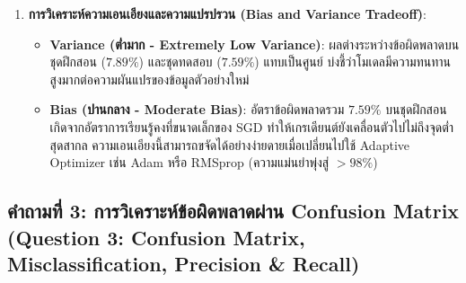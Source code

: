 \documentclass[12pt,a4paper]{article}
\begin{document}
\begin{ansbox}
\begin{enumerate}[leftmargin=18pt, itemsep=3pt]
    \item \textbf{การวิเคราะห์ความเอนเอียงและความแปรปรวน (Bias and Variance Tradeoff)}:
    \begin{itemize}[leftmargin=12pt, itemsep=2pt]
        \item \textbf{Variance (ต่ำมาก - Extremely Low Variance)}: ผลต่างระหว่างข้อผิดพลาดบนชุดฝึกสอน ($7.89\%$) และชุดทดสอบ ($7.59\%$) แทบเป็นศูนย์ บ่งชี้ว่าโมเดลมีความทนทานสูงมากต่อความผันแปรของข้อมูลตัวอย่างใหม่
        \item \textbf{Bias (ปานกลาง - Moderate Bias)}: อัตราข้อผิดพลาดรวม $7.59\%$ บนชุดฝึกสอนเกิดจากอัตราการเรียนรู้คงที่ขนาดเล็กของ SGD ทำให้เกรเดียนต์ยังเคลื่อนตัวไปไม่ถึงจุดต่ำสุดสากล ความเอนเอียงนี้สามารถขจัดได้อย่างง่ายดายเมื่อเปลี่ยนไปใช้ Adaptive Optimizer เช่น Adam หรือ RMSprop (ความแม่นยำพุ่งสู่ $>98\%$)
    \end{itemize}
\end{enumerate}
\end{ansbox}

\clearpage
\subsection*{คำถามที่ 3: การวิเคราะห์ข้อผิดพลาดผ่าน Confusion Matrix\\ \normalsize(Question 3: Confusion Matrix, Misclassification, Precision \& Recall)}
\end{document}
